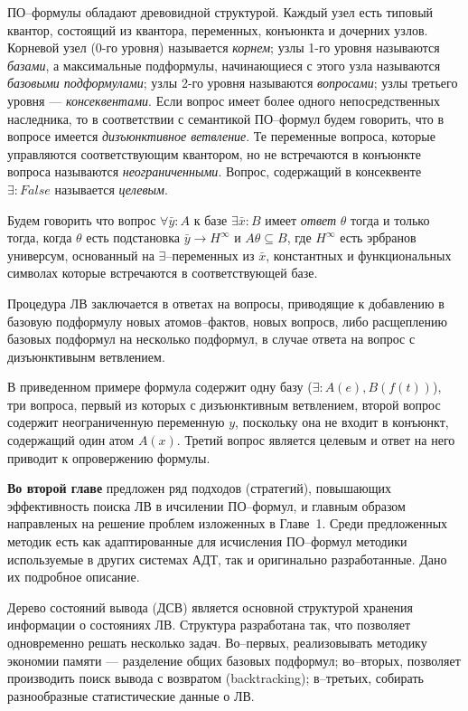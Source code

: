\documentclass[a4paper]{report}
\begin{document}
ПО--формулы обладают древовидной структурой. Каждый узел есть типовый квантор, состоящий из квантора, переменных, конъюнкта и дочерних узлов. Корневой узел (0-го уровня) называется \emph{корнем}; узлы 1-го уровня называются \emph{базами}, а максимальные подформулы, начинающиеся с этого узла называются \emph{базовыми подформулами}; узлы 2-го уровня называются \emph{вопросами}; узлы третьего уровня --- \emph{консеквентами}. Если вопрос имеет более одного непосредственных наследника, то в соответствии с семантикой ПО--формул будем говорить, что в вопросе имеется \emph{дизъюнктивное ветвление}. Те переменные вопроса, которые управляются соответствующим квантором, но не встречаются в конъюнкте вопроса называются \emph{неограниченными}. Вопрос, содержащий в консеквенте $\exists: False$ называется \emph{целевым}.

Будем говорить что вопрос $\forall \bar{y}\colon A$ к базе $\exists \bar{x}\colon B$ имеет {\em ответ} $\theta$  тогда и только тогда, когда $\theta$ есть подстановка $\bar{y} \rightarrow H^{\infty}$ и $A\theta \subseteq B$, где $H^{\infty}$ есть эрбранов универсум, основанный на $\exists$--переменных из $\bar{x}$, константных и функциональных символах которые встречаются в соответствующей базе.

Процедура ЛВ заключается в ответах на вопросы, приводящие к добавлению в базовую подформулу новых атомов--фактов, новых вопросв, либо расщеплению базовых подформул на несколько подформул, в случае ответа на вопрос с дизъюнктивынм ветвлением.

В приведенном примере формула содержит одну базу ($\exists: A(e),B(f(t))$), три вопроса, первый из которых с дизъюнктивным ветвлением, второй вопрос содержит неограниченную переменную $y$, поскольку она не входит в конъюнкт, содержащий один атом $A(x)$. Третий вопрос является целевым и ответ на него приводит к опровержению формулы.



\textbf{Во второй главе} предложен ряд подходов (стратегий), повышающих эффективность поиска ЛВ в ичсилении ПО--формул, и главным образом направленых на решение проблем изложенных в Главе~1. Среди предложенных методик есть как адаптированные для исчисления ПО--формул методики используемые в других системах АДТ, так и оригинально разработанные. Дано их подробное описание.

Дерево состояний вывода (ДСВ) является основной структурой хранения информации о состояниях ЛВ. Структура разработана так, что позволяет одновременно решать несколько задач. Во--первых, реализовывать методику экономии памяти --- разделение общих базовых подформул; во--вторых, позволяет производить поиск вывода с возвратом (backtracking); в--третьих, собирать разнообразные статистические данные о ЛВ.
\end{document}
